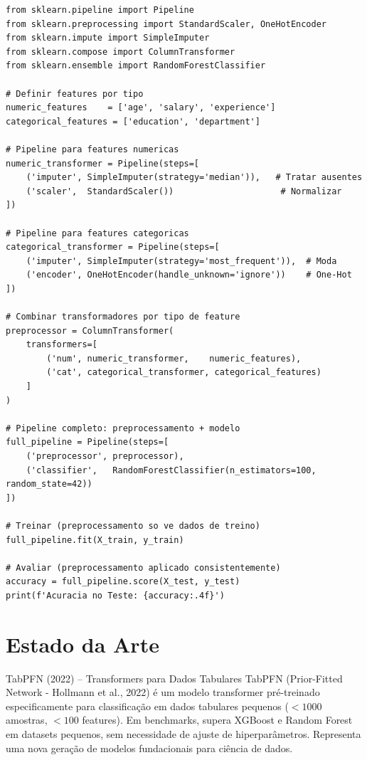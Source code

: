 \documentclass[12pt,a4paper]{article}
\begin{document}
\begin{lstlisting}[style=mypython, caption={Pipeline completo com ColumnTransformer}]
from sklearn.pipeline import Pipeline
from sklearn.preprocessing import StandardScaler, OneHotEncoder
from sklearn.impute import SimpleImputer
from sklearn.compose import ColumnTransformer
from sklearn.ensemble import RandomForestClassifier

# Definir features por tipo
numeric_features    = ['age', 'salary', 'experience']
categorical_features = ['education', 'department']

# Pipeline para features numericas
numeric_transformer = Pipeline(steps=[
    ('imputer', SimpleImputer(strategy='median')),   # Tratar ausentes
    ('scaler',  StandardScaler())                     # Normalizar
])

# Pipeline para features categoricas
categorical_transformer = Pipeline(steps=[
    ('imputer', SimpleImputer(strategy='most_frequent')),  # Moda
    ('encoder', OneHotEncoder(handle_unknown='ignore'))    # One-Hot
])

# Combinar transformadores por tipo de feature
preprocessor = ColumnTransformer(
    transformers=[
        ('num', numeric_transformer,    numeric_features),
        ('cat', categorical_transformer, categorical_features)
    ]
)

# Pipeline completo: preprocessamento + modelo
full_pipeline = Pipeline(steps=[
    ('preprocessor', preprocessor),
    ('classifier',   RandomForestClassifier(n_estimators=100, random_state=42))
])

# Treinar (preprocessamento so ve dados de treino)
full_pipeline.fit(X_train, y_train)

# Avaliar (preprocessamento aplicado consistentemente)
accuracy = full_pipeline.score(X_test, y_test)
print(f'Acuracia no Teste: {accuracy:.4f}')
\end{lstlisting}

\section{Estado da Arte}

\begin{estadoartebox}{TabPFN (2022) -- Transformers para Dados Tabulares}
TabPFN (Prior-Fitted Network - Hollmann et al., 2022) é um modelo transformer pré-treinado especificamente para classificação em dados tabulares pequenos ($< 1000$ amostras, $< 100$ features). Em benchmarks, supera XGBoost e Random Forest em datasets pequenos, sem necessidade de ajuste de hiperparâmetros. Representa uma nova geração de modelos fundacionais para ciência de dados.
\end{estadoartebox}
\end{document}
